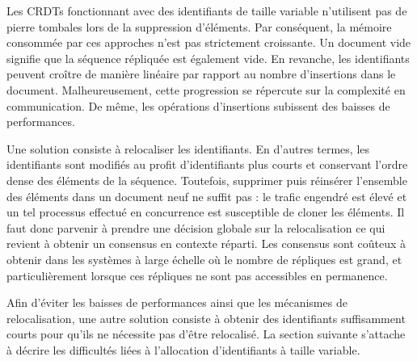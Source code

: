 Les CRDTs fonctionnant avec des identifiants de taille variable n'utilisent pas
de pierre tombales lors de la suppression d'éléments. Par conséquent, la mémoire
consommée par ces approches n'est pas strictement croissante. Un document vide
signifie que la séquence répliquée est également vide. En revanche, les
identifiants peuvent croître de manière linéaire par rapport au nombre
d'insertions dans le document. Malheureusement, cette progression se répercute
sur la complexité en communication. De même, les opérations d'insertions
subissent des baisses de performances.

Une solution consiste à relocaliser les identifiants. En d'autres termes, les
identifiants sont modifiés au profit d'identifiants plus courts et conservant
l'ordre dense des éléments de la séquence. Toutefois, supprimer puis réinsérer
l'ensemble des éléments dans un document neuf ne suffit pas : le trafic engendré
est élevé et un tel processus effectué en concurrence est susceptible de cloner
les éléments. Il faut donc parvenir à prendre une décision globale sur la
relocalisation ce qui revient à obtenir un consensus en contexte réparti. Les
consensus sont coûteux à obtenir dans les systèmes à large échelle où le nombre
de répliques est grand, et particulièrement lorsque ces répliques ne sont pas
accessibles en permanence.

Afin d'éviter les baisses de performances ainsi que les mécanismes de
relocalisation, une autre solution consiste à obtenir des identifiants
suffisamment courts pour qu'ils ne nécessite pas d'être relocalisé. La section
suivante s'attache à décrire les difficultés liées à l'allocation d'identifiants
à taille variable.

